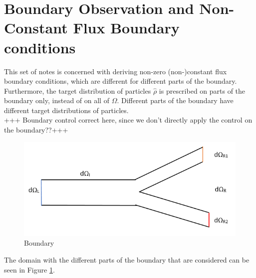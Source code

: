 \documentclass[11pt, a4paper]{article}
\newcommand{\Sta}{\rho}
\theoremstyle{definition}
\begin{document}

\section*{Boundary Observation and Non-Constant Flux Boundary conditions}
This set of notes is concerned with deriving non-zero (non-)constant flux boundary conditions, which are different for different parts of the boundary. 
Furthermore, the target distribution of particles $\hat \Sta$ is prescribed on parts of the boundary only, instead of on all of $\Omega$. Different parts of the boundary have different target distributions of particles.\\
+++ Boundary control correct here, since we don't directly apply the control on the boundary??+++


\begin{figure}[h]
	\includegraphics[scale=0.8]{bound.png}
	\caption{Boundary}
    \label{Boundary1}
\end{figure}
The domain with the different parts of the boundary that are considered can be seen in Figure \ref{Boundary1}.
\end{document}
